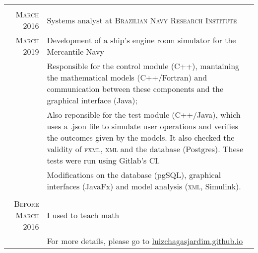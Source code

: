 \documentclass[a4paper,10pt]{article}
\begin{document}
\begin{tabular}{r|p{11cm}}
\multicolumn{2}{c}{}\\

\textsc{March 2016} & Systems analyst at \textsc{Brazilian Navy Research Institute}\\
\textsc{March 2019} & Development of a ship's engine room simulator for the Mercantile Navy\\&
\footnotesize{Responsible for the control module (C++), mantaining the mathematical models (C++/Fortran) and communication between these components and the graphical interface (Java);}\\&
\footnotesize{Also reponsible for the test module (C++/Java), which uses a .json file to simulate user operations and verifies the outcomes given by the models. It also checked the validity of \textsc{fxml}, \textsc{xml} and the database (Postgres). These tests were run using Gitlab's CI.}\\&
\footnotesize{Modifications on the database (pgSQL), graphical interfaces (JavaFx) and model analysis (\textsc{xml}, Simulink).}\\

\multicolumn{2}{c}{}\\

\textsc{Before March 2016} & I used to teach math\\
& \footnotesize{For more details, please go to \href{http://luizchagasjardim.github.io}{luizchagasjardim.github.io}}
\end{tabular}

\end{document}

